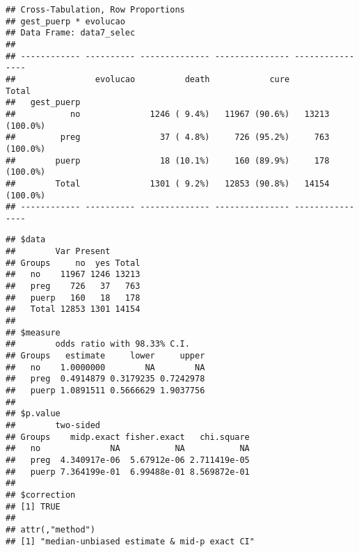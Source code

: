 \documentclass[
]{article}
\newenvironment{Shaded}{\begin{snugshade}}{\end{snugshade}}
\newcommand{\DataTypeTok}[1]{\textcolor[rgb]{0.13,0.29,0.53}{#1}}
\newcommand{\KeywordTok}[1]{\textcolor[rgb]{0.13,0.29,0.53}{\textbf{#1}}}
\newcommand{\NormalTok}[1]{#1}
\newcommand{\OperatorTok}[1]{\textcolor[rgb]{0.81,0.36,0.00}{\textbf{#1}}}
\newcommand{\OtherTok}[1]{\textcolor[rgb]{0.56,0.35,0.01}{#1}}
\newcommand{\StringTok}[1]{\textcolor[rgb]{0.31,0.60,0.02}{#1}}
\begin{document}
\begin{Shaded}
\end{Shaded}

\begin{verbatim}
## Cross-Tabulation, Row Proportions  
## gest_puerp * evolucao  
## Data Frame: data7_selec  
## 
## ------------ ---------- -------------- --------------- ----------------
##                evolucao          death            cure            Total
##   gest_puerp                                                           
##           no              1246 ( 9.4%)   11967 (90.6%)   13213 (100.0%)
##         preg                37 ( 4.8%)     726 (95.2%)     763 (100.0%)
##        puerp                18 (10.1%)     160 (89.9%)     178 (100.0%)
##        Total              1301 ( 9.2%)   12853 (90.8%)   14154 (100.0%)
## ------------ ---------- -------------- --------------- ----------------
\end{verbatim}

\begin{Shaded}
\end{Shaded}

\begin{verbatim}
## $data
##        Var Present
## Groups     no  yes Total
##   no    11967 1246 13213
##   preg    726   37   763
##   puerp   160   18   178
##   Total 12853 1301 14154
## 
## $measure
##        odds ratio with 98.33% C.I.
## Groups   estimate     lower     upper
##   no    1.0000000        NA        NA
##   preg  0.4914879 0.3179235 0.7242978
##   puerp 1.0891511 0.5666629 1.9037756
## 
## $p.value
##        two-sided
## Groups    midp.exact fisher.exact   chi.square
##   no              NA           NA           NA
##   preg  4.340917e-06  5.67912e-06 2.711419e-05
##   puerp 7.364199e-01  6.99488e-01 8.569872e-01
## 
## $correction
## [1] TRUE
## 
## attr(,"method")
## [1] "median-unbiased estimate & mid-p exact CI"
\end{verbatim}
\end{document}

